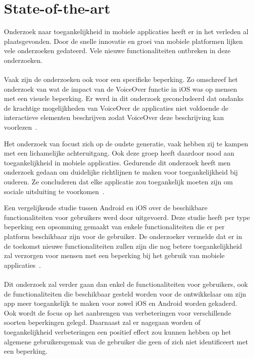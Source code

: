 
\section{State-of-the-art}
\label{sec:state-of-the-art}

Onderzoek naar toegankelijkheid in mobiele applicaties heeft er in het verleden al plaatsgevonden. Door de snelle innovatie en groei van mobiele platformen lijken vele onderzoeken gedateerd. Vele nieuwe functionaliteiten ontbreken in deze onderzoeken.
\\~\\
Vaak zijn de onderzoeken ook voor een specifieke beperking. Zo omschreef het onderzoek van \citeauthor{leporini2012interacting} wat de impact van de VoiceOver functie in iOS was op mensen met een visuele beperking. Er werd in dit onderzoek geconcludeerd dat ondanks de krachtige mogelijkheden van VoiceOver de applicaties niet voldoende de interactieve elementen beschrijven zodat VoiceOver deze beschrijving kan voorlezen~\autocite{leporini2012interacting}. 

Het onderzoek van \citeauthor{diaz2014accessibility} focust zich op de oudste generatie, vaak hebben zij te kampen met een lichamelijke achteruitgang. Ook deze groep heeft daardoor nood aan toegankelijkheid in mobiele applicaties. Gedurende dit onderzoek heeft men onderzoek gedaan om duidelijke richtlijnen te maken voor toegankelijkheid bij ouderen. Ze concluderen dat elke applicatie zou toegankelijk moeten zijn om sociale uitsluiting te voorkomen~\autocite{diaz2014accessibility}. 

Een vergelijkende studie tussen Android en iOS over de beschikbare functionaliteiten voor gebruikers werd door \citeauthor{10.1007/978-3-319-07638-6_14} uitgevoerd. Deze studie heeft per type beperking een opsomming gemaakt van enkele functionaliteiten die er per platform beschikbaar zijn voor de gebruiker. De onderzoeker vermelde dat er in de toekomst nieuwe functionaliteiten zullen zijn die nog betere toegankelijkheid zal verzorgen voor mensen met een beperking bij het gebruik van mobiele applicaties~\autocite{10.1007/978-3-319-07638-6_14}. 
\\~\\
Dit onderzoek zal verder gaan dan enkel de functionaliteiten voor gebruikers, ook de functionaliteiten die beschikbaar gesteld worden voor de ontwikkelaar om zijn app meer toegankelijk te maken voor zowel iOS en Android worden gekaderd. Ook wordt de focus op het aanbrengen van verbeteringen voor verschillende soorten beperkingen gelegd. Daarnaast zal er nagegaan worden of toegankelijkheid verbeteringen een positief effect zou kunnen hebben op het algemene gebruikersgemak van de gebruiker die geen of zich niet identificeert met een beperking.


